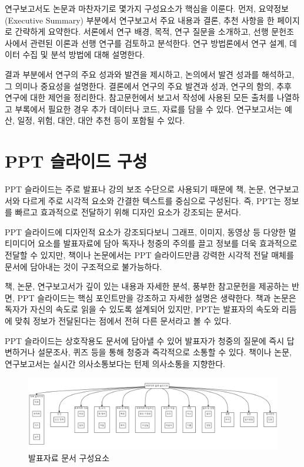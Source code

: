\documentclass[
  letterpaper,
]{book}
\begin{document}
연구보고서도 논문과 마찬자기로 몇가지 구성요소가 핵심을 이룬다. 먼저,
요약정보(Executive Summary) 부분에서 연구보고서 주요 내용과 결론, 추천
사항을 한 페이지로 간략하게 요약한다. 서론에서 연구 배경, 목적, 연구
질문을 소개하고, 선행 문헌조사에서 관련된 이론과 선행 연구를 검토하고
분석한다. 연구 방법론에서 연구 설계, 데이터 수집 및 분석 방법에 대해
설명한다.

결과 부분에서 연구의 주요 성과와 발견을 제시하고, 논의에서 발견 성과를
해석하고, 그 의미나 중요성을 설명한다. 결론에서 연구의 주요 발견과 성과,
연구의 함의, 추후 연구에 대한 제언을 정리한다. 참고문헌에서 보고서
작성에 사용된 모든 출처를 나열하고 부록에서 필요한 경우 추가 데이터나
코드, 자료를 담을 수 있다. 연구보고서는 예산, 일정, 위험, 대안, 대안
추천 등이 포함될 수 있다.

\hypertarget{ppt-uxc2acuxb77cuxc774uxb4dc-uxad6cuxc131}{%
\section{PPT 슬라이드
구성}\label{ppt-uxc2acuxb77cuxc774uxb4dc-uxad6cuxc131}}

PPT 슬라이드는 주로 발표나 강의 보조 수단으로 사용되기 때문에 책, 논문,
연구보고서와 다르게 주로 시각적 요소와 간결한 텍스트를 중심으로
구성된다. 즉, PPT는 정보를 빠르고 효과적으로 전달하기 위해 디자인 요소가
강조되는 문서다.

PPT 슬라이드에 디자인적 요소가 강조되다보니 그래프, 이미지, 동영상 등
다양한 멀티미디어 요소를 발표자료에 담아 독자나 청중의 주의를 끌고
정보를 더욱 효과적으로 전달할 수 있지만, 책이나 논문에서는 PPT
슬라이드만큼 강력한 시각적 전달 매체를 문서에 담아내는 것이 구조적으로
불가능하다.

책, 논문, 연구보고서가 깊이 있는 내용과 자세한 분석, 풍부한 참고문헌을
제공하는 반면, PPT 슬라이드는 핵심 포인트만을 강조하고 자세한 설명은
생략한다. 책과 논문은 독자가 자신의 속도로 읽을 수 있도록 설계되어
있지만, PPT는 발표자의 속도와 리듬에 맞춰 정보가 전달된다는 점에서 전혀
다른 문서라고 볼 수 있다.

PPT 슬라이드는 상호작용도 문서에 담아낼 수 있어 발표자가 청중의 질문에
즉시 답변하거나 설문조사, 퀴즈 등을 통해 청중과 즉각적으로 소통할 수
있다. 책이나 논문, 연구보고서는 실시간 의사소통보다는 턴제 의사소통을
지향한다.

\begin{figure}

{\centering \includegraphics{images/mermaid_ppt.png}

}

\caption{발표자료 문서 구성요소}

\end{figure}
\end{document}
